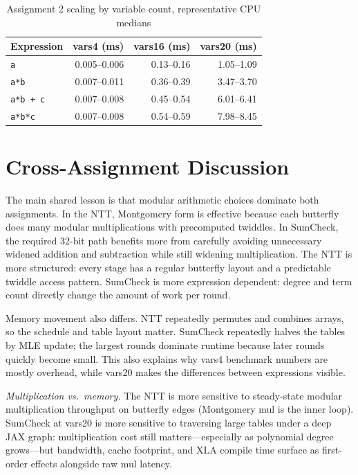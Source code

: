 \documentclass[conference]{IEEEtran}
\begin{document}
\begin{table}[htbp]
\caption{Assignment 2 scaling by variable count, representative CPU medians}
\label{tab:a2-scaling}
\centering
\scriptsize
\setlength{\tabcolsep}{2pt}
\begin{tabular}{@{}lrrr@{}}
\toprule
Expression & vars4 (ms) & vars16 (ms) & vars20 (ms) \\
\midrule
\texttt{a}       & 0.005--0.006 & 0.13--0.16 & 1.05--1.09 \\
\texttt{a*b}     & 0.007--0.011 & 0.36--0.39 & 3.47--3.70 \\
\texttt{a*b + c} & 0.007--0.008 & 0.45--0.54 & 6.01--6.41 \\
\texttt{a*b*c}   & 0.007--0.008 & 0.54--0.59 & 7.98--8.45 \\
\bottomrule
\end{tabular}
\end{table}

\section{Cross-Assignment Discussion}
The main shared lesson is that modular arithmetic choices dominate both
assignments. In the NTT, Montgomery form is effective because each butterfly
does many modular multiplications with precomputed twiddles. In SumCheck, the
required 32-bit path benefits more from carefully avoiding unnecessary widened
addition and subtraction while still widening multiplication. The NTT is more
structured: every stage has a regular butterfly layout and a predictable
twiddle access pattern. SumCheck is more expression dependent: degree and term
count directly change the amount of work per round.

Memory movement also differs. NTT repeatedly permutes and combines arrays, so
the schedule and table layout matter. SumCheck repeatedly halves the tables by
MLE update; the largest rounds dominate runtime because later rounds quickly
become small. This also explains why vars4 benchmark numbers are mostly
overhead, while vars20 makes the differences between expressions visible.

\textit{Multiplication vs.\ memory.}
The NTT is more sensitive to steady-state modular multiplication throughput on
butterfly edges (Montgomery mul is the inner loop). SumCheck at vars20 is more
sensitive to traversing large tables under a deep JAX graph: multiplication
cost still matters---especially as polynomial degree grows---but bandwidth,
cache footprint, and XLA compile time surface as first-order effects alongside
raw mul latency.
\end{document}

